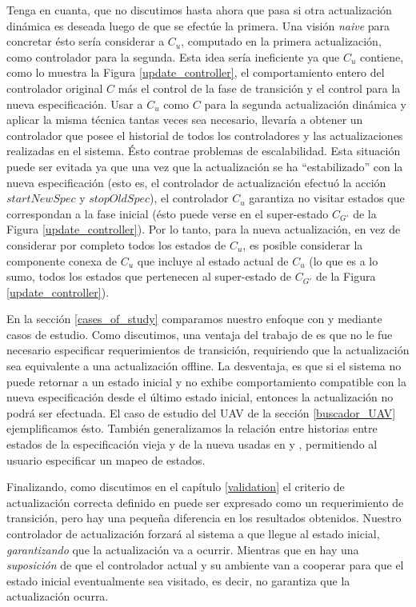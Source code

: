 Tenga en cuanta, que no discutimos hasta ahora que pasa si otra actualización dinámica es deseada luego de que se
efectúe la primera. Una visión \emph{naive} para concretar ésto sería considerar a $C_u$, computado en la primera
actualización, como controlador para la segunda. Esta idea sería ineficiente ya que  $C_u$ contiene, como lo muestra la
Figura \ref{update_controller}, el comportamiento entero del controlador original $C$ más el control de la fase de transición y el
control para la nueva especificación. Usar a $C_u$ como $C$ para la segunda actualización dinámica y aplicar la misma
técnica tantas veces sea necesario, llevaría a obtener un controlador que posee el historial de todos los controladores
y las actualizaciones realizadas en el sistema. Ésto contrae problemas de escalabilidad. Esta situación puede ser
evitada ya que una vez que la actualización se ha ``estabilizado'' con la nueva especificación (esto es, el controlador
de actualización efectuó la acción $startNewSpec$ y $stopOldSpec$), el controlador $C_u$ garantiza no visitar estados
que correspondan a la fase inicial (ésto puede verse en el super-estado $C_{G'}$ de la Figura \ref{update_controller}).
Por lo tanto, para la nueva actualización, en vez de considerar por completo todos los estados de $C_u$, es posible
considerar la componente conexa de $C_u$ que incluye al estado actual de $C_u$ (lo que es a lo sumo, todos los estados
que pertenecen al super-estado de $C_{G'}$ de la Figura \ref{update_controller}).

En la sección \ref{cases_of_study} comparamos nuestro enfoque con \cite{6224401} y
\cite{PanzicaLaManna:2013:FCC:2487336.2487349} mediante casos de estudio. Como discutimos, una ventaja del trabajo de
\cite{6224401} es que no le fue necesario especificar requerimientos de transición, requiriendo que la actualización sea
equivalente a una actualización offline. La desventaja, es que si el sistema no puede retornar a un estado inicial y no
exhibe comportamiento compatible con la nueva especificación desde el último estado inicial, entonces la actualización
no podrá ser efectuada. El caso de estudio del UAV de la sección \ref{buscador_UAV} ejemplificamos ésto. También
generalizamos la relación entre historias entre estados de la especificación vieja y de la nueva usadas en
\cite{6224401} y \cite{PanzicaLaManna:2013:FCC:2487336.2487349}, permitiendo al usuario especificar un mapeo de estados.

Finalizando, como discutimos en el capítulo \ref{validation} el criterio de actualización correcta definido en
\cite{6224401} puede ser expresado como un requerimiento de transición, pero hay una pequeña diferencia en los
resultados obtenidos. Nuestro controlador de actualización forzará al sistema a que llegue al estado inicial,
\emph{garantizando} que la actualización va a ocurrir. Mientras que en \cite{6224401} hay una \emph{suposición} de que el
controlador actual y su ambiente van a cooperar para que el estado inicial eventualmente sea visitado, es decir, no
garantiza que la actualización ocurra.
